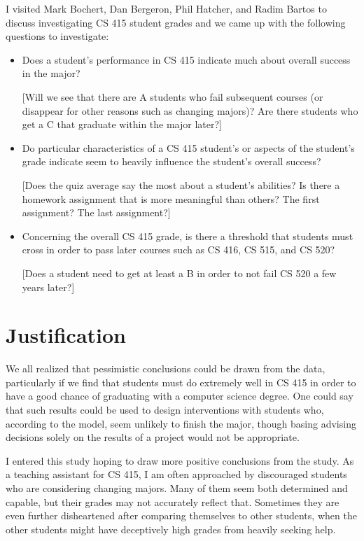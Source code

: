 \documentclass[letterpaper,11pt]{article}
\begin{document}
I visited Mark Bochert, Dan Bergeron, Phil Hatcher, and Radim Bartos to discuss investigating CS 415 student grades and we came up with the following questions to investigate:

\begin{itemize}
\item Does a student's performance in CS 415 indicate much about overall success in the major?

[Will we see that there are A students who fail subsequent courses (or disappear for other reasons such as changing majors)?  Are there students who get a C that graduate within the major later?]
\item Do particular characteristics of a CS 415 student's or aspects of the student's grade indicate seem to heavily influence the student's overall success?

[Does the quiz average say the most about a student's abilities?  Is there a homework assignment that is more meaningful than others?  The first assignment?  The last assignment?]
\item Concerning the overall CS 415 grade, is there a threshold that students must cross in order to pass later courses such as CS 416, CS 515, and CS 520?

[Does a student need to get at least a B in order to not fail CS 520 a few years later?]
\end{itemize}

\section{Justification}

We all realized that pessimistic conclusions could be drawn from the data, particularly if we find that students must do extremely well in CS 415 in order to have a good chance of graduating with a computer science degree.  One could say that such results could be used to design interventions with students who, according to the model, seem unlikely to finish the major, though basing advising decisions solely on the results of a project would not be appropriate.

I entered this study hoping to draw more positive conclusions from the study.  As a teaching assistant for CS 415, I am often approached by discouraged students who are considering changing majors.  Many of them seem both determined and capable, but their grades may not accurately reflect that.  Sometimes they are even further disheartened after comparing themselves to other students, when the other students might have deceptively high grades from heavily seeking help.
\end{document}
